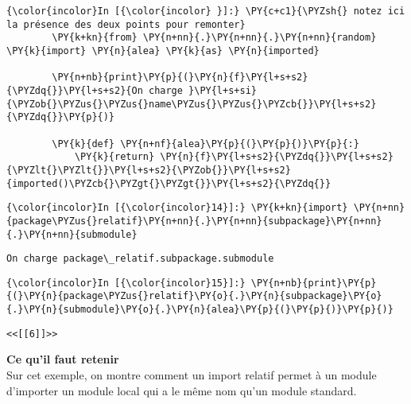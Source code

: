     \begin{Verbatim}[commandchars=\\\{\}]
{\color{incolor}In [{\color{incolor} }]:} \PY{c+c1}{\PYZsh{} notez ici la présence des deux points pour remonter}
        \PY{k+kn}{from} \PY{n+nn}{.}\PY{n+nn}{.}\PY{n+nn}{random} \PY{k}{import} \PY{n}{alea} \PY{k}{as} \PY{n}{imported}
        
        \PY{n+nb}{print}\PY{p}{(}\PY{n}{f}\PY{l+s+s2}{\PYZdq{}}\PY{l+s+s2}{On charge }\PY{l+s+si}{\PYZob{}\PYZus{}\PYZus{}name\PYZus{}\PYZus{}\PYZcb{}}\PY{l+s+s2}{\PYZdq{}}\PY{p}{)}
        
        \PY{k}{def} \PY{n+nf}{alea}\PY{p}{(}\PY{p}{)}\PY{p}{:}
            \PY{k}{return} \PY{n}{f}\PY{l+s+s2}{\PYZdq{}}\PY{l+s+s2}{\PYZlt{}\PYZlt{}}\PY{l+s+s2}{\PYZob{}}\PY{l+s+s2}{imported()\PYZcb{}\PYZgt{}\PYZgt{}}\PY{l+s+s2}{\PYZdq{}}
\end{Verbatim}


    \begin{Verbatim}[commandchars=\\\{\}]
{\color{incolor}In [{\color{incolor}14}]:} \PY{k+kn}{import} \PY{n+nn}{package\PYZus{}relatif}\PY{n+nn}{.}\PY{n+nn}{subpackage}\PY{n+nn}{.}\PY{n+nn}{submodule}
\end{Verbatim}


    \begin{Verbatim}[commandchars=\\\{\}]
On charge package\_relatif.subpackage.submodule

    \end{Verbatim}

    \begin{Verbatim}[commandchars=\\\{\}]
{\color{incolor}In [{\color{incolor}15}]:} \PY{n+nb}{print}\PY{p}{(}\PY{n}{package\PYZus{}relatif}\PY{o}{.}\PY{n}{subpackage}\PY{o}{.}\PY{n}{submodule}\PY{o}{.}\PY{n}{alea}\PY{p}{(}\PY{p}{)}\PY{p}{)}
\end{Verbatim}


    \begin{Verbatim}[commandchars=\\\{\}]
<<[[6]]>>

    \end{Verbatim}

    \textbf{Ce qu'il faut retenir}\\

Sur cet exemple, on montre comment un import relatif permet à un module
d'importer un module local qui a le même nom qu'un module standard.

